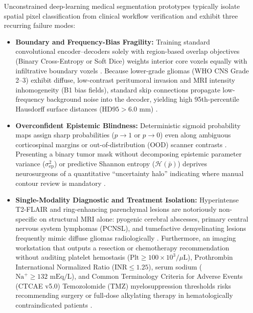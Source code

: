 \documentclass[conference]{IEEEtran}
\begin{document}
Unconstrained deep-learning medical segmentation prototypes typically isolate spatial pixel classification from clinical workflow verification and exhibit three recurring failure modes:
\begin{itemize}
    \item \textbf{Boundary and Frequency-Bias Fragility:} Training standard convolutional encoder--decoders solely with region-based overlap objectives (Binary Cross-Entropy or Soft Dice) weights interior core voxels equally with infiltrative boundary voxels \cite{ronneberger2015unet, milletari2016vnet}. Because lower-grade gliomas (WHO CNS Grade 2--3) exhibit diffuse, low-contrast peritumoral invasion and MRI intensity inhomogeneity (B1 bias fields), standard skip connections propagate low-frequency background noise into the decoder, yielding high 95th-percentile Hausdorff surface distances ($\text{HD95} > 6.0\text{ mm}$) \cite{kervadec2021boundary, karimi2020hd}.
    \item \textbf{Overconfident Epistemic Blindness:} Deterministic sigmoid probability maps assign sharp probabilities ($p \to 1$ or $p \to 0$) even along ambiguous corticospinal margins or out-of-distribution (OOD) scanner contrasts \cite{guo2017calibration, kendall2017uncertainties}. Presenting a binary tumor mask without decomposing epistemic parameter variance ($\sigma_{\text{ep}}^2$) or predictive Shannon entropy ($\mathcal{H}(\bar{p})$) deprives neurosurgeons of a quantitative ``uncertainty halo'' indicating where manual contour review is mandatory \cite{gal2016dropout, zou2022tbrats}.
    \item \textbf{Single-Modality Diagnostic and Treatment Isolation:} Hyperintense T2-FLAIR and ring-enhancing parenchymal lesions are notoriously non-specific on structural MRI alone: pyogenic cerebral abscesses, primary central nervous system lymphomas (PCNSL), and tumefactive demyelinating lesions frequently mimic diffuse gliomas radiologically \cite{wen2010rano, arevalo2017gmu}. Furthermore, an imaging workstation that outputs a resection or chemotherapy recommendation without auditing platelet hemostasis ($\text{Plt} \ge 100 \times 10^3/\mu\text{L}$), Prothrombin International Normalized Ratio ($\text{INR} \le 1.25$), serum sodium ($\text{Na}^+ \ge 132\text{ mEq/L}$), and Common Terminology Criteria for Adverse Events (CTCAE v5.0) Temozolomide (TMZ) myelosuppression thresholds risks recommending surgery or full-dose alkylating therapy in hematologically contraindicated patients \cite{stupp2005radiotherapy, ctcae2017v5}.
\end{itemize}
\end{document}
